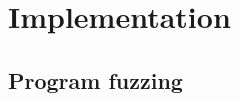 \documentclass[runningheads,a4paper]{llncs}
\begin{document}




 









\section{Implementation}

\subsection{Program fuzzing}
\end{document}
